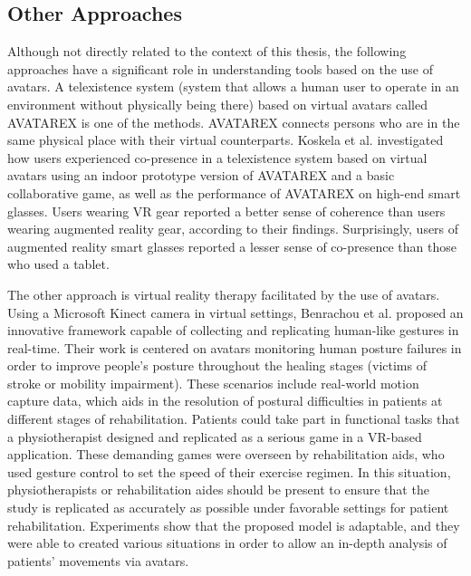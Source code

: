 \subsection{Other Approaches}
Although not directly related to the context of this thesis, the following approaches have a significant role in understanding tools based on the use of avatars. A telexistence system (system that allows a human user to operate in an environment without physically being there) based on virtual avatars called AVATAREX is one of the methods. AVATAREX connects persons who are in the same physical place with their virtual counterparts. Koskela et al. \cite{KOS18} investigated how users experienced co-presence in a telexistence system based on virtual avatars using an indoor prototype version of AVATAREX and a basic collaborative game, as well as the performance of AVATAREX on high-end smart glasses. Users wearing VR gear reported a better sense of coherence than users wearing augmented reality gear, according to their findings. Surprisingly, users of augmented reality smart glasses reported a lesser sense of co-presence than those who used a tablet.

The other approach is virtual reality therapy facilitated by the use of avatars. Using a Microsoft Kinect camera in virtual settings, Benrachou et al. \cite{BEN20} proposed an innovative framework capable of collecting and replicating human-like gestures in real-time. Their work is centered on avatars monitoring human posture failures in order to improve people's posture throughout the healing stages (victims of stroke or mobility impairment). These scenarios include real-world motion capture data, which aids in the resolution of postural difficulties in patients at different stages of rehabilitation. Patients could take part in functional tasks that a physiotherapist designed and replicated as a serious game in a VR-based application. These demanding games were overseen by rehabilitation aids, who used gesture control to set the speed of their exercise regimen. In this situation, physiotherapists or rehabilitation aides should be present to ensure that the study is replicated as accurately as possible under favorable settings for patient rehabilitation. Experiments show that the proposed model is adaptable, and they were able to created various situations in order to allow an in-depth analysis of patients' movements via avatars.

